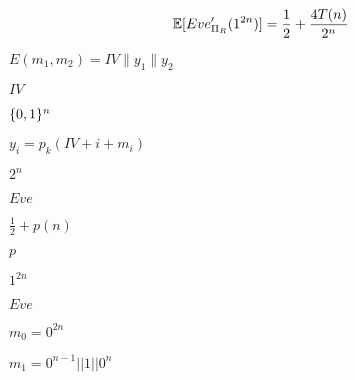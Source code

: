 \documentclass[10pt]{book}
\begin{document}
\begin{mdSnippets}
\begin{mdDisplaySnippet}[d7c5245954dfceffbd1f6a652a7e6136]
\[%
\E[Eve'_{\Pi_R}(1^{2n})] = \frac{1}{2} + \frac{4T(n)}{2^n}
\]%
\end{mdDisplaySnippet}%
\begin{mdInlineSnippet}[f1466d97999858e5d983fa44ff51f002]%
$E(m_1,m_2) = IV\|y_1\|y_2$\end{mdInlineSnippet}%
\begin{mdInlineSnippet}[cf482c5807b62034beeabdb795c5a689]%
$IV$\end{mdInlineSnippet}%
\begin{mdInlineSnippet}[5867c9b098884eca2779f6d98d4b0b29]%
$\{0,1\}^n$\end{mdInlineSnippet}%
\begin{mdInlineSnippet}[2d8373b357997d66bb49520d08b9e7eb]%
$y_i = p_k(IV+i+m_i)$\end{mdInlineSnippet}%
\begin{mdInlineSnippet}[d1db0d9c696a8c056e7117dbbb4ef6db]%
$2^n$\end{mdInlineSnippet}%
\begin{mdInlineSnippet}%
$Eve$\end{mdInlineSnippet}%
\begin{mdInlineSnippet}[64f5991003da134cc68fa343d048ebac]%
$\frac{1}{2} + p(n)$\end{mdInlineSnippet}%
\begin{mdInlineSnippet}[83878c91171338902e0fe0fb97a8c47a]%
$p$\end{mdInlineSnippet}%
\begin{mdInlineSnippet}[0bb2a9040d090145aff6b7570cb4f7c1]%
$1^{2n}$\end{mdInlineSnippet}%
\begin{mdInlineSnippet}%
$Eve$\end{mdInlineSnippet}%
\begin{mdInlineSnippet}%
$m_0 = 0^{2n}$\end{mdInlineSnippet}%
\begin{mdInlineSnippet}[a6fc59cbaec4135e8b0bb883f6036723]%
$m_1 = 0^{n-1}||1||0^n$\end{mdInlineSnippet}%
\begin{mdInlineSnippet}%

\end{mdInlineSnippet}
\end{mdSnippets}
\end{document}
